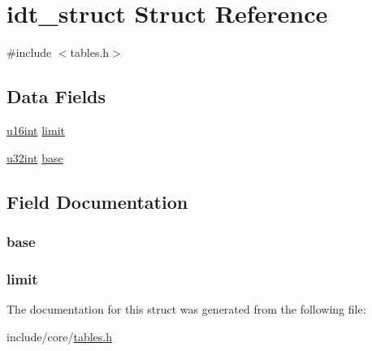 \hypertarget{structidt__struct}{}\section{idt\+\_\+struct Struct Reference}
\label{structidt__struct}


{\ttfamily \#include $<$tables.\+h$>$}

\subsection*{Data Fields}
\begin{DoxyCompactItemize}
\item 
\hyperlink{system_8h_a863d9497073aad2b991aeab2211d87af}{u16int} \hyperlink{structidt__struct_a68fd3b4f6c14a331ca9b226cbf122e13}{limit}
\item 
\hyperlink{system_8h_a757de76cafbcddaac0d1632902fe4cb8}{u32int} \hyperlink{structidt__struct_ab5763c2b18c825c8b8fba44b2e60ddc1}{base}
\end{DoxyCompactItemize}


\subsection{Field Documentation}
\subsubsection[{\texorpdfstring{base}{base}}]{ base}\hypertarget{structidt__struct_ab5763c2b18c825c8b8fba44b2e60ddc1}{}\label{structidt__struct_ab5763c2b18c825c8b8fba44b2e60ddc1}
\subsubsection[{\texorpdfstring{limit}{limit}}]{ limit}\hypertarget{structidt__struct_a68fd3b4f6c14a331ca9b226cbf122e13}{}\label{structidt__struct_a68fd3b4f6c14a331ca9b226cbf122e13}


The documentation for this struct was generated from the following file\+:\begin{DoxyCompactItemize}
\item 
include/core/\hyperlink{tables_8h}{tables.\+h}\end{DoxyCompactItemize}
